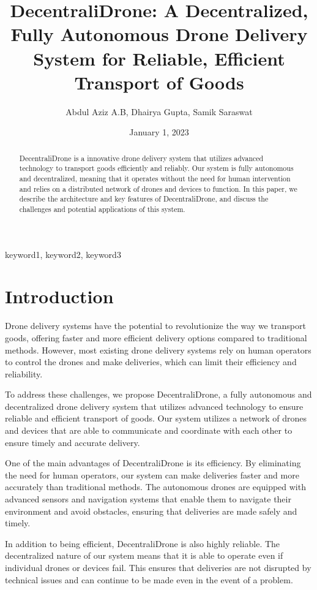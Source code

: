 \documentclass[conference]{IEEEtran}
\title{DecentraliDrone: A Decentralized, Fully Autonomous Drone Delivery System for Reliable, Efficient Transport of Goods}
\author{Abdul Aziz A.B, Dhairya Gupta, Samik Saraswat}
\date{January 1, 2023}
\begin{document}
\maketitle

\begin{abstract}
DecentraliDrone is a innovative drone delivery system that utilizes advanced technology to transport goods efficiently and reliably. Our system is fully autonomous and decentralized, meaning that it operates without the need for human intervention and relies on a distributed network of drones and devices to function. In this paper, we describe the architecture and key features of DecentraliDrone, and discuss the challenges and potential applications of this system.
\end{abstract}

\begin{IEEEkeywords}
keyword1, keyword2, keyword3
\end{IEEEkeywords}

\section{Introduction}
Drone delivery systems have the potential to revolutionize the way we transport goods, offering faster and more efficient delivery options compared to traditional methods. However, most existing drone delivery systems rely on human operators to control the drones and make deliveries, which can limit their efficiency and reliability.

To address these challenges, we propose DecentraliDrone, a fully autonomous and decentralized drone delivery system that utilizes advanced technology to ensure reliable and efficient transport of goods. Our system utilizes a network of drones and devices that are able to communicate and coordinate with each other to ensure timely and accurate delivery.

One of the main advantages of DecentraliDrone is its efficiency. By eliminating the need for human operators, our system can make deliveries faster and more accurately than traditional methods. The autonomous drones are equipped with advanced sensors and navigation systems that enable them to navigate their environment and avoid obstacles, ensuring that deliveries are made safely and timely.

In addition to being efficient, DecentraliDrone is also highly reliable. The decentralized nature of our system means that it is able to operate even if individual drones or devices fail. This ensures that deliveries are not disrupted by technical issues and can continue to be made even in the event of a problem.
\end{document}
